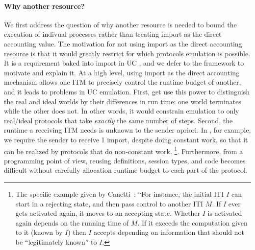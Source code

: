 \paragraph{Why another resource?} 
We first address the question of why another resource is needed to bound the execution of indivual processes rather than treating import as the direct accounting value.
The motivation for not using import as the direct accounting resource is that it would greatly restrict for which protocols emulation is possible.
It is a requirement baked into import in UC \cite{canettiUC}, and we defer to the framework to motivate and explain it.
At a high level, using import as the direct accounting mechanism allows one ITM to precisely control the runtime budget of another, and it leads to problems in UC emulation.
First, \Z get use this power to distinguish the real and ideal worlds by their differences in run time: one world terminates while the other does not. 
In other words, it would constrain emulation to only real/ideal protocols that take \emph{exactly} the same number of steps.
Second, the runtime a receiving ITM needs is unknown to the sender apriori.
In \Fcom, for example, we require the sender to receive 1 import, despite \Fcom doing constant work, so that it can be realized by protocols that do non-constant work.
\footnote{The specific example given by Canetti~\cite{canettiUC}: ``For instance, the initial ITI $I$ can start in a rejecting state, and then pass control to another ITI $M$. If $I$ ever gets activated again, it moves to an accepting state. Whether $I$ is activated again depends on the running time of $M$. If it exceeds the computation given to it (known by $I$) then $I$ accepts depending on information that should not be ``legitimately known'' to $I$.}.
Furthermore, from a programming point of view, reusing definitions, session types, and code becomes difficult without carefully allocation runtime budget to each part of the protocol.

